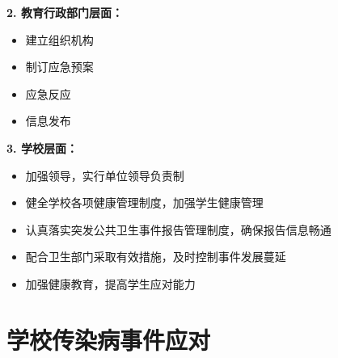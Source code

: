 \begin{keybox}
\textbf{2. 教育行政部门层面：}
\begin{itemize}[leftmargin=*]
    \item 建立组织机构
    \item 制订应急预案
    \item 应急反应
    \item 信息发布
\end{itemize}

\textbf{3. 学校层面：}
\begin{itemize}[leftmargin=*]
    \item 加强领导，实行单位领导负责制
    \item 健全学校各项健康管理制度，加强学生健康管理
    \item 认真落实突发公共卫生事件报告管理制度，确保报告信息畅通
    \item 配合卫生部门采取有效措施，及时控制事件发展蔓延
    \item 加强健康教育，提高学生应对能力
\end{itemize}
\end{keybox}

\section{学校传染病事件应对}

